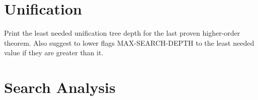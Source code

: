 \section{Unification}

\begin{description} 
\item[\parbox{\textwidth}{LEAST-SEARCH-DEPTH}]  
Print the least needed unification tree depth for the last proven 
higher-order theorem. Also suggest to lower flags MAX-SEARCH-DEPTH to the least
needed value if they are greater than it.
\item
\end{description}

\section{Search Analysis}

